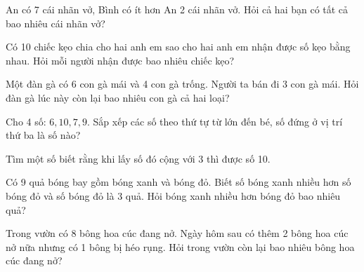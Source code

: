 \begin{ex}
An có 7 cái nhãn vở, Bình có ít hơn An 2 cái nhãn vở. Hỏi cả hai bạn có tất cả bao nhiêu cái nhãn vở?
\end{ex}

\begin{ex}
Có 10 chiếc kẹo chia cho hai anh em sao cho hai anh em nhận được số kẹo bằng nhau. Hỏi mỗi người nhận được bao nhiêu chiếc kẹo?
\end{ex}

\begin{ex}
Một đàn gà có 6 con gà mái và 4 con gà trống. Người ta bán đi 3 con gà mái. Hỏi đàn gà lúc này còn lại bao nhiêu con gà cả hai loại?
\end{ex}

\begin{ex}
Cho 4 số: $6, 10, 7, 9$. Sắp xếp các số theo thứ tự từ lớn đến bé, số đứng ở vị trí thứ ba là số nào?
\end{ex}

\begin{ex}
Tìm một số biết rằng khi lấy số đó cộng với 3 thì được số 10.
\end{ex}

\begin{ex}
Có 9 quả bóng bay gồm bóng xanh và bóng đỏ. Biết số bóng xanh nhiều hơn số bóng đỏ và số bóng đỏ là 3 quả. Hỏi bóng xanh nhiều hơn bóng đỏ bao nhiêu quả?
\end{ex}

\begin{ex}
Trong vườn có 8 bông hoa cúc đang nở. Ngày hôm sau có thêm 2 bông hoa cúc nở nữa nhưng có 1 bông bị héo rụng. Hỏi trong vườn còn lại bao nhiêu bông hoa cúc đang nở?
\end{ex}

